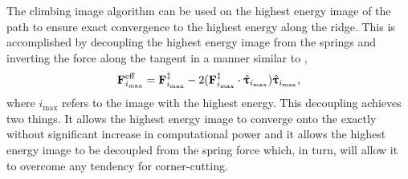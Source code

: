 The climbing image algorithm \cite{neb-ci-2000} can be used on the highest energy image of the path to ensure exact convergence to the highest energy  along the ridge.
This is accomplished by decoupling the highest energy image from the springs and inverting the force along the tangent in a manner similar to ,
\begin{equation}
{\ensuremath{\mathrm{\mathbf{\bm{F}}}}}_{i_\text{max}}^\text{eff} = {\mathrm{\mathbf{\bm{F}}}}_{i_\text{max}}^\ddagger - 2 ({\mathrm{\mathbf{\bm{F}}}}_{i_\text{max}}^\ddagger \cdot \hat{{\mathrm{\mathbf{\bm{\uptau}}}}}_{i_\text{max}})\hat{{\mathrm{\mathbf{\bm{\uptau}}}}}_{i_\text{max}},
\label{eq:neb-ci}
\end{equation}
where $i_\text{max}$ refers to the image with the highest energy.
This decoupling achieves two things.
It allows the highest energy image to converge onto the  exactly without significant increase in computational power and it allows the highest energy image to be decoupled from the spring force which, in turn, will allow it to overcome any tendency for corner-cutting.



